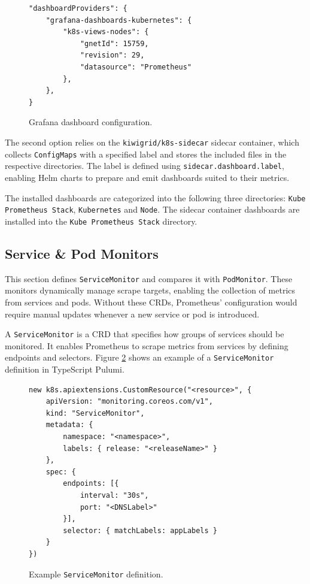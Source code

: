\begin{figure}[h]
    \centering
\begin{verbatim}
"dashboardProviders": {
    "grafana-dashboards-kubernetes": {
        "k8s-views-nodes": {
            "gnetId": 15759,
            "revision": 29,
            "datasource": "Prometheus"
        },
    },
}
\end{verbatim}
    \caption{Grafana dashboard configuration.}
    \label{fig:grafana_dashboard}
\end{figure}

The second option relies on the \texttt{kiwigrid/k8s-sidecar} sidecar container, which collects \texttt{ConfigMaps} with a specified label and stores the included files in the respective directories. The label is defined using \texttt{sidecar.dashboard.label}, enabling Helm charts to prepare and emit dashboards suited to their metrics.

The installed dashboards are categorized into the following three directories: \texttt{Kube Prometheus Stack}, \texttt{Kubernetes} and \texttt{Node}. The sidecar container dashboards are installed into the \texttt{Kube Prometheus Stack} directory.

\subsection{Service \& Pod Monitors}
This section defines \texttt{ServiceMonitor} and compares it with \texttt{PodMonitor}. These monitors dynamically manage scrape targets, enabling the collection of metrics from services and pods. Without these CRDs, Prometheus' configuration would require manual updates whenever a new service or pod is introduced.

A \texttt{ServiceMonitor} is a CRD that specifies how groups of services should be monitored. It enables Prometheus to scrape metrics from services by defining endpoints and selectors. Figure \ref{fig:servicemonitor_example} shows an example of a \texttt{ServiceMonitor} definition in TypeScript Pulumi.

\begin{figure}[h]
    \centering
\begin{verbatim}
new k8s.apiextensions.CustomResource("<resource>", {
    apiVersion: "monitoring.coreos.com/v1",
    kind: "ServiceMonitor",
    metadata: {
        namespace: "<namespace>",
        labels: { release: "<releaseName>" }
    },
    spec: {
        endpoints: [{ 
            interval: "30s", 
            port: "<DNSLabel>" 
        }],
        selector: { matchLabels: appLabels }
    }
})
\end{verbatim}
    \caption{Example \texttt{ServiceMonitor} definition.}
    \label{fig:servicemonitor_example}
\end{figure}

